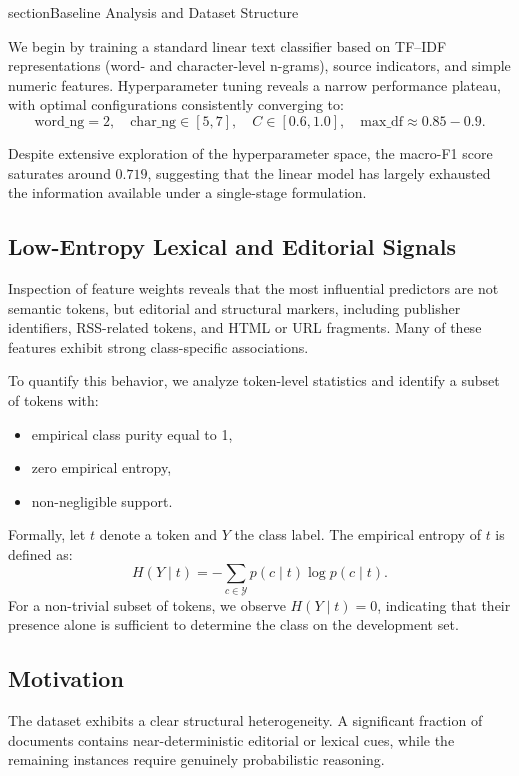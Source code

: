 section{Baseline Analysis and Dataset Structure}

We begin by training a standard linear text classifier based on TF--IDF representations (word- and character-level n-grams), source indicators, and simple numeric features.
Hyperparameter tuning reveals a narrow performance plateau, with optimal configurations consistently converging to:
\[
\text{word\_ng} = 2,\quad \text{char\_ng} \in [5,7],\quad C \in [0.6,1.0],\quad \text{max\_df} \approx 0.85{-}0.9.
\]

Despite extensive exploration of the hyperparameter space, the macro-F1 score saturates around $0.719$, suggesting that the linear model has largely exhausted the information available under a single-stage formulation.
\subsection{Low-Entropy Lexical and Editorial Signals}

Inspection of feature weights reveals that the most influential predictors are not semantic tokens, but editorial and structural markers, including publisher identifiers, RSS-related tokens, and HTML or URL fragments.
Many of these features exhibit strong class-specific associations.

To quantify this behavior, we analyze token-level statistics and identify a subset of tokens with:
\begin{itemize}
	\item empirical class purity equal to 1,
	\item zero empirical entropy,
	\item non-negligible support.
\end{itemize}

Formally, let $t$ denote a token and $Y$ the class label.
The empirical entropy of $t$ is defined as:
\[
H(Y \mid t) = - \sum_{c \in \mathcal{Y}} p(c \mid t)\log p(c \mid t).
\]
For a non-trivial subset of tokens, we observe $H(Y \mid t) = 0$, indicating that their presence alone is sufficient to determine the class on the development set.
\subsection{Motivation}

The dataset exhibits a clear structural heterogeneity.
A significant fraction of documents contains near-deterministic editorial or lexical cues, while the remaining instances require genuinely probabilistic reasoning.

